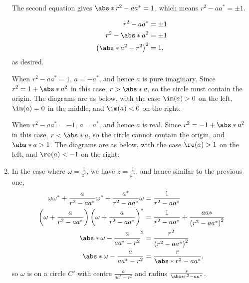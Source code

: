 \begin{enumerate}
          The second equation gives \(\abs*{r^2 - a a^*} = 1\), which means \(r^2 - a a^* = \pm 1\).

          \begin{align*}
              r^2 - a a^*                     & = \pm 1 \\
              r^2 - \abs*{a}^2                & = \pm 1 \\
              \left(\abs*{a}^2 - r^2\right)^2 & = 1,
          \end{align*}
          as desired.

          When \(r^2 - a a^* = 1\), \(a = - a^*\), and hence \(a\) is pure imaginary. Since \(r^2 = 1 + \abs*{a}^2\) in this case, \(r > \abs*{a}\), so the circle must contain the origin. The diagrams are as below, with the case \(\im(a) > 0\) on the left, \(\im(a) = 0\) in the middle, and \(\im(a) < 0\) on the right:
          \begin{center}
              
              
              
          \end{center}

          When \(r^2 - a a^* = -1\), \(a = a^*\), and hence \(a\) is real. Since \(r^2 = -1 + \abs*{a}^2\) in this case, \(r < \abs*{a}\), so the circle cannot contain the origin, and \(\abs*{a} > 1\). The diagrams are as below, with the case \(\re(a) > 1\) on the left, and \(\re(a) < -1\) on the right:
          \begin{center}
              
              
          \end{center}

    \item In the case where \(\omega = \frac{1}{z^*}\), we have \(z = \frac{1}{\omega^*}\), and hence similar to the previous one,
          \begin{align*}
              \omega \omega^* + \frac{a}{r^2 - a a^*} \omega^* + \frac{a^*}{r^2 - a a^*} \omega             & = \frac{1}{r^2 - a a^*}                                           \\
              \left(\omega + \frac{a}{r^2 - a a^{*}}\right) \left(\omega + \frac{a}{r^2 - a a^{*}}\right)^* & = \frac{1}{r^2 - a a^*} + \frac{a a*}{\left(r^2 - a a^*\right)^2} \\
              \abs*{\omega - \frac{a}{a a^{*} - r^2}}^2                                                     & = \frac{r^2}{\left(r^2 - a a^*\right)^2}                          \\
              \abs*{\omega - \frac{a}{a a^{*} - r^2}}                                                       & = \frac{r}{\abs*{r^2 - a a^*}},
          \end{align*}
          so \(\omega\) is on a circle \(C'\) with centre \(\frac{a}{a a^{*} - r^2}\) and radius \(\frac{r}{\abs*{r^2 - a a^*}}\).


\end{enumerate}
